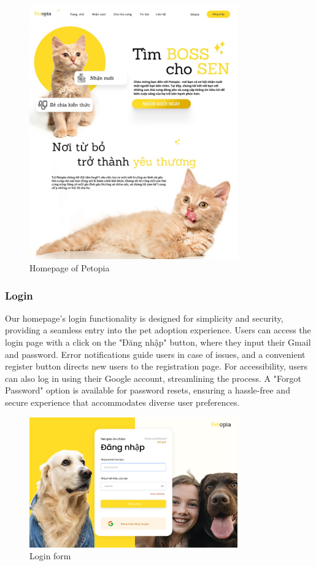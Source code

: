 \begin {figure}[H]
\centering
\includegraphics[width=0.8\textwidth]{Figures/UI/home_ui.jpg}
\caption{Homepage of Petopia}
\end{figure}

\subsubsection{Login}

Our homepage's login functionality is designed for simplicity and security, providing a seamless entry into the pet adoption experience. Users can access the login page with a click on the "Đăng nhập" button, where they input their Gmail and password. Error notifications guide users in case of issues, and a convenient register button directs new users to the registration page. For accessibility, users can also log in using their Google account, streamlining the process. A "Forgot Password" option is available for password resets, ensuring a hassle-free and secure experience that accommodates diverse user preferences.

\begin{figure}[H]
    \centering
    \includegraphics[width=0.8\textwidth]{Figures/UI/login_ui.png}
    \caption{Login form}
\end{figure}


